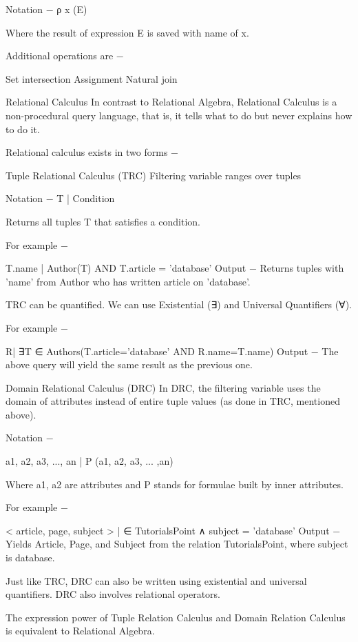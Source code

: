 Notation − ρ x (E)

Where the result of expression E is saved with name of x.

Additional operations are −

Set intersection
Assignment
Natural join

Relational Calculus
In contrast to Relational Algebra, Relational Calculus is a non-procedural query language, that is, it tells what to do but never explains how to do it.

Relational calculus exists in two forms −

Tuple Relational Calculus (TRC)
Filtering variable ranges over tuples

Notation − {T | Condition}

Returns all tuples T that satisfies a condition.

For example −

{ T.name |  Author(T) AND T.article = 'database' }
Output − Returns tuples with 'name' from Author who has written article on 'database'.

TRC can be quantified. We can use Existential (∃) and Universal Quantifiers (∀).

For example −

{ R| ∃T   ∈ Authors(T.article='database' AND R.name=T.name)}
Output − The above query will yield the same result as the previous one.

Domain Relational Calculus (DRC)
In DRC, the filtering variable uses the domain of attributes instead of entire tuple values (as done in TRC, mentioned above).

Notation −

{ a1, a2, a3, ..., an | P (a1, a2, a3, ... ,an)}

Where a1, a2 are attributes and P stands for formulae built by inner attributes.

For example −

{< article, page, subject > |  ∈ TutorialsPoint ∧ subject = 'database'}
Output − Yields Article, Page, and Subject from the relation TutorialsPoint, where subject is database.

Just like TRC, DRC can also be written using existential and universal quantifiers. DRC also involves relational operators.

The expression power of Tuple Relation Calculus and Domain Relation Calculus is equivalent to Relational Algebra.
